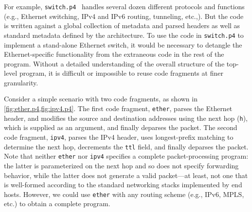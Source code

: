 \documentclass[letterpaper,twocolumn,10pt]{article}
\begin{document}
For example, \texttt{switch.p4}~\cite{switch.p4} handles several dozen
different protocols and functions (e.g., Ethernet switching, IPv4 and
IPv6 routing, tunneling, etc.,). But the code is written against a
global collection of metadata and parsed headers as well as standard
metadata defined by the architecture. To use the code in
\texttt{switch.p4} to implement a stand-alone Ethernet switch, it
would be necessary to detangle the Ethernet-specific functionality
from the extraneous code in the rest of the program. Without a
detailed understanding of the overall structure of the top-level
program, it is difficult or impossible to reuse code fragments at
finer granularity.

Consider a simple scenario with two code fragments, as shown in
\cref{fig:ether.p4,fig:ipv4.p4}. The first code fragment,
\texttt{ether}, parses the Ethernet header, and modifies the source
and destination addresses using the next hop (\texttt{h}), which is
supplied as an argument, and finally deparses the packet. The second
code fragment, \texttt{ipv4}, parses the IPv4 header, uses
longest-prefix matching to determine the next hop, decrements the
\texttt{ttl} field, and finally deparses the packet. Note that neither
\texttt{ether} nor \texttt{ipv4} specifies a complete
packet-processing program: the latter is parameterized on the next hop
and so does not specify forwarding behavior, while the latter does not
generate a valid packet---at least, not one that is well-formed
according to the standard networking stacks implemented by end hosts.
However, we could use \texttt{ether} with any routing scheme (e.g.,
IPv6, MPLS, etc.) to obtain a complete program.


\end{document}
